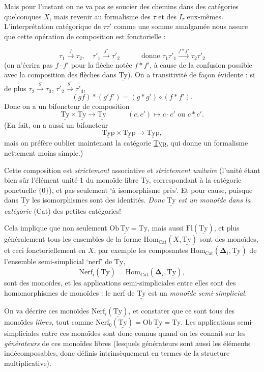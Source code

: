 \documentclass[11pt]{article}
\newcommand{\printedpage}[1]{\if\relax\detokenize{#1}\relax\else\marginpar{\raggedright\footnotesize p.~#1}\fi}
\newcommand{\msp}[1]{\marginpar{\raggedright\footnotesize [#1]}}
\newcommand{\Ty}{\mathrm{Ty}}
\newcommand{\uTy}{\underline{\mathrm{Ty}}}
\newcommand{\uTyp}{\underline{\mathrm{Typ}}}
\begin{document}
Mais pour l'instant on ne va pas se soucier des chemins dans des catégories quelconques $X$, mais revenir au formalisme des $\tau$ et des $I_\tau$ eux-mêmes. L'interprétation catégorique de $\tau\tau'$ comme une somme amalgamée nous assure que cette opération de composition est fonctorielle :

\msp{page 50}
\[
\tau_1 \xrightarrow{\ f\ } \tau_2, \quad \tau'_1 \xrightarrow{\ f'\ } \tau'_2 \qquad\quad \text{donne } \tau_1\tau'_1 \xrightarrow{f*f'} \tau_2\tau'_2
\]
(on n'écrira pas $f \cdot f'$ pour la flèche notée $f * f'$, à cause de la confusion possible avec la composition des flèches dans $\uTy$). On a transitivité de façon évidente : si de plus $\tau_2 \xrightarrow{\ g\ } \tau_3$, $\tau'_2 \xrightarrow{\ g'\ } \tau'_3$,
\[
(gf) * (g'f') = (g * g') \circ (f * f').
\]
Donc on a un bifoncteur de composition
\[
\uTy \times \uTy \longrightarrow \uTy \qquad\quad (c,c') \longmapsto c \cdot c' \text{ ou } c * c'.
\]
(En fait, on a aussi un bifoncteur
\[
\uTyp \times \uTyp \longrightarrow \uTyp,
\]
mais on préfère oublier maintenant la catégorie \underline{Typ}, qui donne un formalisme nettement moins simple.)

Cette composition est \textit{strictement} associative et \textit{strictement unitaire} (l'unité étant bien sûr l'élément unité 1 du monoïde libre Ty, correspondant à la catégorie ponctuelle $\{0\}$), et pas seulement `à isomorphisme près'. Et pour cause, puisque dans $\uTy$ les isomorphismes sont des identités. \textit{Donc} $\uTy$ \textit{est un monoïde dans la catégorie} (Cat) des petites catégories!

\msp{page 49$'$: second page so numbered}Cela implique que non seulement $\mathrm{Ob}\,\uTy = \Ty$, mais aussi $\mathrm{Fl}(\uTy)$, et plus généralement tous les ensembles de la forme $\mathrm{Hom}_{\mathrm{Cat}}(X, \uTy)$ sont des monoïdes, et ceci fonctoriellement en $X$, par exemple les composantes $\mathrm{Hom}_{\mathrm{Cat}}(\boldsymbol{\Delta}_i, \uTy)$ de l'ensemble semi-simplicial `nerf' de $\uTy$,
\[
\mathrm{Nerf}_i(\uTy) = \mathrm{Hom}_{\mathrm{Cat}}(\boldsymbol{\Delta}_i, \uTy),
\]
sont des monoïdes, et les applications semi-simpliciales entre elles sont des homomorphismes de monoïdes : le nerf de $\uTy$ est un \textit{monoïde semi-simplicial.}

\printedpage{34}
On va décrire ces monoïdes $\mathrm{Nerf}_i(\uTy)$, et constater que ce sont tous des monoïdes \textit{libres,} tout comme $\mathrm{Nerf}_0(\uTy) = \mathrm{Ob}\,\uTy = \mathrm{Ty}$. Les applications semi-simpliciales entre ces monoïdes sont donc connus quand on les connaît sur les \textit{générateurs} de ces monoïdes libres (lesquels générateurs sont aussi les éléments indécomposables, donc définis intrinsèquement en termes de la structure multiplicative). %
\end{document}
